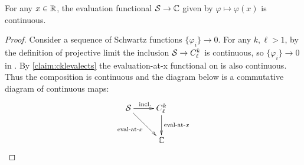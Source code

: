       \begin{thm}
        \label{thm:sevalcts}
        For any $x\in\mathbb{R}$, the evaluation functional $\mathcal{S}\rightarrow\mathbb{C}$ given by $ \varphi\mapsto\varphi(x) $ is continuous.
      \end{thm}
      \begin{proof}
        Consider a sequence of Schwartz functions $\{\varphi_i\}\rightarrow0$.
        For any $k,\ell>1$, by the definition of projective limit the inclusion $\mathcal{S}\rightarrow{C^k_\ell}$ is continuous, so $\{\varphi_i\}\rightarrow 0$ in \Ckl.
        By \cref{claim:cklevalects} the evaluation-at-x functional on \Ckl is also continuous.
        Thus the composition is continuous and the diagram below is a commutative diagram of continuous maps:
        \begin{displaymath}
          \xymatrix{
          \S \ar[r]^{\text{incl.}} \ar[dr]_{\text{eval-at-}x} & \Ckl \ar[d]^{\text{eval-at-}x}\\
          & \C
          }
        \end{displaymath}
      \end{proof}


